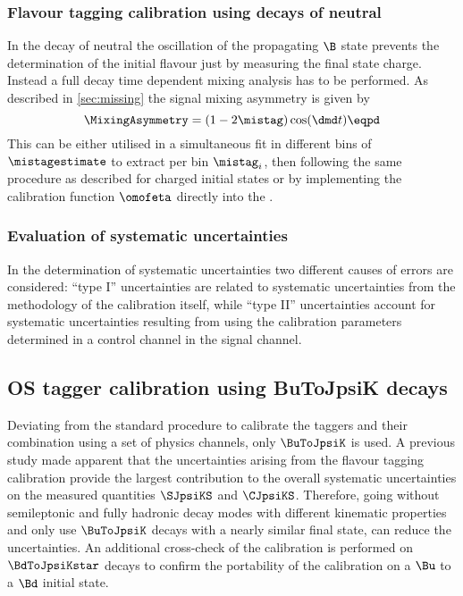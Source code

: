 \subsubsection{Flavour tagging calibration using decays of neutral \Bmesons}
\label{sec:flavour_tagging:calibration:method:neutral}

In the decay of neutral \Bmesons the oscillation of the propagating $\B$ state
prevents the determination of the initial flavour just by measuring the final
state charge. Instead a full decay time dependent mixing analysis has to be
performed. As described in \cref{sec:missing} the signal mixing asymmetry is
given by
%
\begin{equation}
  \MixingAsymmetry = (1 - 2\mistag)\cos(\dmd t)\eqpd
\end{equation}
%
This can be either utilised in a simultaneous fit in different bins of
$\mistagestimate$ to extract per bin $\mistag_i$, then following the same
procedure as described for charged initial states or by implementing the
calibration function $\omofeta$ directly into the \PDF.

\subsubsection{Evaluation of systematic uncertainties}
\label{sec:flavour_tagging:calibration:method:systematics}

In the determination of systematic uncertainties two different causes of errors
are considered: \enquote{type I} uncertainties are related to systematic
uncertainties from the methodology of the calibration itself, while
\enquote{type II} uncertainties account for systematic uncertainties resulting
from using the calibration parameters determined in a control channel in the
signal channel.

\subsection{\ac{OS} tagger calibration using BuToJpsiK decays}
\label{sec:flavour_tagging:calibration:os}

Deviating from the standard procedure to calibrate the \OS taggers and their
combination using a set of physics channels, only $\BuToJpsiK$ is used. A
previous study \cite{Aaij:1497268} made apparent that the uncertainties arising
from the flavour tagging calibration provide the largest contribution to the
overall systematic uncertainties on the measured quantities $\SJpsiKS$ and
$\CJpsiKS$. Therefore, going without semileptonic and fully hadronic decay modes
with different kinematic properties and only use $\BuToJpsiK$ decays with a
nearly similar final state, can reduce the uncertainties. An additional
cross-check of the calibration is performed on $\BdToJpsiKstar$ decays to
confirm the portability of the calibration on a $\Bu$ to a $\Bd$ initial state.

